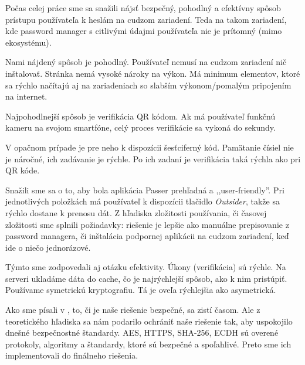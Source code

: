 \indent Počas celej práce sme sa snažili nájsť bezpečný, pohodlný a efektívny spôsob prístupu používateľa k heslám na cudzom zariadení. Teda na takom zariadení, kde password manager s citlivými údajmi používateľa nie je prítomný (mimo ekosystému).

Nami nájdený spôsob je pohodlný. Používateľ nemusí na cudzom zariadení nič inštalovať. Stránka nemá vysoké nároky na výkon. Má minimum elementov, ktoré sa rýchlo načítajú aj na zariadeniach so slabším výkonom/pomalým pripojením na internet. 

Najpohodlnejší spôsob je verifikácia QR kódom. Ak má používateľ funkčnú kameru na svojom smartfóne, celý proces verifikácie sa vykoná do sekundy.

V opačnom prípade je pre neho k dispozícii šesťciferný kód. Pamätanie čísiel nie je náročné, ich zadávanie je rýchle. Po ich zadaní je verifikácia taká rýchla ako pri QR kóde. 

Snažili sme sa o to, aby bola aplikácia Passer prehľadná a ,,user-friendly''. Pri jednotlivých položkách má používateľ k dispozícii tlačidlo \textit{Outsider}, takže sa rýchlo dostane k prenosu dát. Z hľadiska zložitosti používania, či časovej zložitosti sme splnili požiadavky: riešenie je lepšie ako manuálne prepisovanie z password managera, či inštalácia podpornej aplikácii na cudzom zariadení, keď ide o niečo jednorázové.

Týmto sme zodpovedali aj otázku efektivity. Úkony (verifikácia) sú rýchle. Na serveri ukladáme dáta do cache, čo je najrýchlejší spôsob, ako k nim pristúpiť. Používame symetrickú kryptografiu. Tá je oveľa rýchlejšia ako asymetrická. 

Ako sme písali v , to, či je naše riešenie bezpečné, sa zistí časom. Ale z teoretického hľadiska sa nám podarilo ochrániť naše riešenie tak, aby uspokojilo dnešné bezpečnostné štandardy. AES, HTTPS, SHA-256, ECDH sú overené protokoly, algoritmy a štandardy, ktoré sú bezpečné a spoľahlivé. Preto sme ich implementovali do finálneho riešenia. 